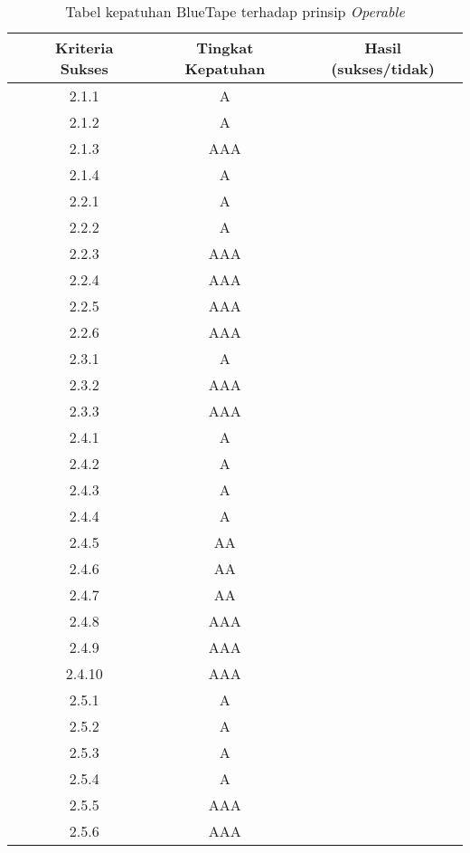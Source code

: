 \begin{table}[H]
    \centering 
    \caption{Tabel kepatuhan BlueTape terhadap prinsip \textit{Operable}}
    \label{tab:kepatuhan_bluetape_operable}
    \begin{tabular}{cccc}
        \toprule
        & Kriteria Sukses & Tingkat Kepatuhan & Hasil (sukses/tidak)\\

        \midrule
        & 2.1.1 & A & \\
        & 2.1.2 & A & \\
        & 2.1.3 & AAA & \\
        & 2.1.4 & A & \\
        & 2.2.1 & A & \\
        & 2.2.2 & A & \\
        & 2.2.3 & AAA & \\
        & 2.2.4 & AAA & \\
        & 2.2.5 & AAA & \\
        & 2.2.6 & AAA & \\
        & 2.3.1 & A & \\
        & 2.3.2 & AAA & \\
        & 2.3.3 & AAA & \\
        & 2.4.1 & A & \\
        & 2.4.2 & A & \\
        & 2.4.3 & A & \\
        & 2.4.4 & A & \\
        & 2.4.5 & AA & \\
        & 2.4.6 & AA & \\
        & 2.4.7 & AA & \\
        & 2.4.8 & AAA & \\
        & 2.4.9 & AAA & \\
        & 2.4.10 & AAA & \\
        & 2.5.1 & A & \\
        & 2.5.2 & A & \\
        & 2.5.3 & A & \\
        & 2.5.4 & A & \\
        & 2.5.5 & AAA & \\
        & 2.5.6 & AAA & \\

        \bottomrule
    
    \end{tabular}
\end{table}

